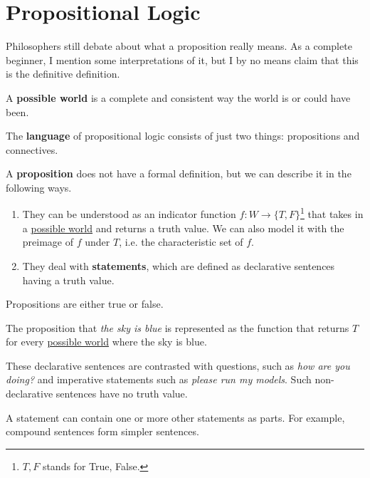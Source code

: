 \section{Propositional Logic} 

  Philosophers still debate about what a proposition really means. As a complete beginner, I mention some interpretations of it, but I by no means claim that this is the definitive definition. 

  \begin{definition}
    \label{def:possible-world}
    A \textbf{possible world} is a complete and consistent way the world is or could have been. 
  \end{definition} 

  The \textbf{language} of propositional logic consists of just two things: propositions and connectives. 

  \begin{definition}[Proposition]
    \label{def:proposition}
    A \textbf{proposition} does not have a formal definition, but we can describe it in the following ways.  
    \begin{enumerate}
      \item They can be understood as an indicator function $f: W \rightarrow \{T, F\}$\footnote{$T, F$ stands for True, False.} that takes in a \hyperref[def:possible-world]{possible world} and returns a truth value. We can also model it with the preimage of $f$ under $T$, i.e. the characteristic set of $f$. 
      \item They deal with \textbf{statements}, which are defined as declarative sentences having a truth value. 
    \end{enumerate} 
    Propositions are either true or false. 
  \end{definition}

  \begin{example}
    \label{ex:the-sky-is-blue}
    The proposition that \textit{the sky is blue} is represented as the function that returns $T$ for every \hyperref[def:possible-world]{possible world} where the sky is blue. 
  \end{example}

  These declarative sentences are contrasted with questions, such as \textit{how are you doing?} and imperative statements such as \textit{please run my models}. Such non-declarative sentences have no truth value. 

  A statement can contain one or more other statements as parts. For example, compound sentences form simpler sentences. 

